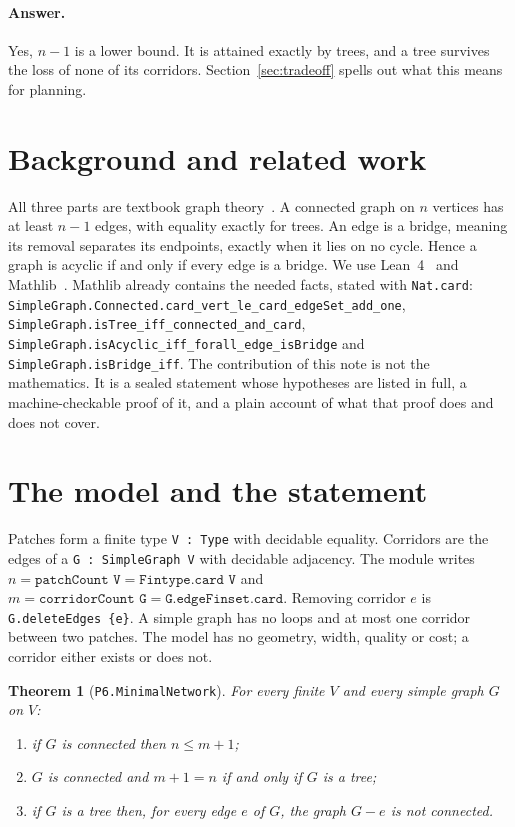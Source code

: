 \documentclass[11pt]{article}
\newtheorem{theorem}{Theorem}
\begin{document}
\paragraph{Answer.} Yes, $n-1$ is a lower bound. It is attained exactly by trees, and a tree survives
the loss of none of its corridors. Section~\ref{sec:tradeoff} spells out what this means for planning.

\section{Background and related work}
All three parts are textbook graph theory~\citep{diestel2017}. A connected graph on $n$ vertices has
at least $n-1$ edges, with equality exactly for trees. An edge is a bridge, meaning its removal
separates its endpoints, exactly when it lies on no cycle. Hence a graph is acyclic if and only if
every edge is a bridge. We use Lean~4~\citep{lean4} and Mathlib~\citep{mathlib2020}. Mathlib already
contains the needed facts, stated with \texttt{Nat.card}:
\texttt{SimpleGraph.Connected.card\_vert\_le\_card\_edgeSet\_add\_one},
\texttt{SimpleGraph.isTree\_iff\_connected\_and\_card},
\texttt{SimpleGraph.isAcyclic\_iff\_forall\_edge\_isBridge} and \texttt{SimpleGraph.isBridge\_iff}.
The contribution of this note is not the mathematics. It is a sealed statement whose hypotheses are listed
in full, a machine-checkable proof of it, and a plain account of what that proof does and does not cover.

\section{The model and the statement}
Patches form a finite type \texttt{V : Type} with decidable equality. Corridors are the edges of a
\texttt{G : SimpleGraph V} with decidable adjacency. The module writes $n=\texttt{patchCount V}=\texttt{Fintype.card V}$ and
$m=\texttt{corridorCount G}=\texttt{G.edgeFinset.card}$. Removing corridor $e$ is \texttt{G.deleteEdges \{e\}}. A simple
graph has no loops and at most one corridor between two patches. The model has no geometry, width,
quality or cost; a corridor either exists or does not.

\begin{theorem}[\texttt{P6.MinimalNetwork}]\label{thm:main}
For every finite $V$ and every simple graph $G$ on $V$:
\begin{enumerate}
\item if $G$ is connected then $n\le m+1$;
\item $G$ is connected and $m+1=n$ if and only if $G$ is a tree;
\item if $G$ is a tree then, for every edge $e$ of $G$, the graph $G-e$ is not connected.
\end{enumerate}
\end{theorem}
\end{document}
